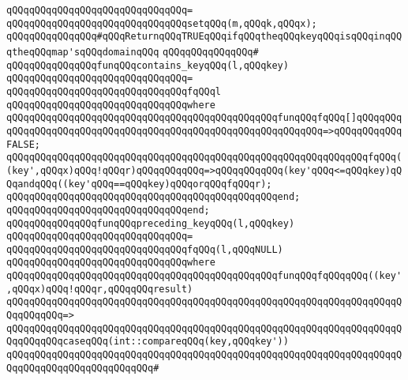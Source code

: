 \verb|qQQqqQQqqQQqqQQqqQQqqQQqqQQqqQQq=|\newline
\verb|qQQqqQQqqQQqqQQqqQQqqQQqqQQqqQQqsetqQQq(m,qQQqk,qQQqx);|\newline
\newline
\newline
\verb|qQQqqQQqqQQqqQQq#qQQqReturnqQQqTRUEqQQqifqQQqtheqQQqkeyqQQqisqQQqinqQQqtheqQQqmap'sqQQqdomainqQQq|\newline
\verb|qQQqqQQqqQQqqQQq#|\newline
\verb|qQQqqQQqqQQqqQQqfunqQQqcontains_keyqQQq(l,qQQqkey)|\newline
\verb|qQQqqQQqqQQqqQQqqQQqqQQqqQQqqQQq=|\newline
\verb|qQQqqQQqqQQqqQQqqQQqqQQqqQQqqQQqfqQQql|\newline
\verb|qQQqqQQqqQQqqQQqqQQqqQQqqQQqqQQqwhere|\newline
\verb|qQQqqQQqqQQqqQQqqQQqqQQqqQQqqQQqqQQqqQQqqQQqqQQqfunqQQqfqQQq[]qQQqqQQqqQQqqQQqqQQqqQQqqQQqqQQqqQQqqQQqqQQqqQQqqQQqqQQqqQQqqQQq=>qQQqqQQqqQQqFALSE;|\newline
\verb|qQQqqQQqqQQqqQQqqQQqqQQqqQQqqQQqqQQqqQQqqQQqqQQqqQQqqQQqqQQqqQQqfqQQq((key',qQQqx)qQQq!qQQqr)qQQqqQQqqQQq=>qQQqqQQqqQQq(key'qQQq<=qQQqkey)qQQqandqQQq((key'qQQq==qQQqkey)qQQqorqQQqfqQQqr);|\newline
\verb|qQQqqQQqqQQqqQQqqQQqqQQqqQQqqQQqqQQqqQQqqQQqqQQqend;|\newline
\verb|qQQqqQQqqQQqqQQqqQQqqQQqqQQqqQQqend;|\newline
\newline
\verb|qQQqqQQqqQQqqQQqfunqQQqpreceding_keyqQQq(l,qQQqkey)|\newline
\verb|qQQqqQQqqQQqqQQqqQQqqQQqqQQqqQQq=|\newline
\verb|qQQqqQQqqQQqqQQqqQQqqQQqqQQqqQQqfqQQq(l,qQQqNULL)|\newline
\verb|qQQqqQQqqQQqqQQqqQQqqQQqqQQqqQQqwhere|\newline
\verb|qQQqqQQqqQQqqQQqqQQqqQQqqQQqqQQqqQQqqQQqqQQqqQQqfunqQQqfqQQqqQQq((key',qQQqx)qQQq!qQQqr,qQQqqQQqresult)|\newline
\verb|qQQqqQQqqQQqqQQqqQQqqQQqqQQqqQQqqQQqqQQqqQQqqQQqqQQqqQQqqQQqqQQqqQQqqQQqqQQqqQQq=>|\newline
\verb|qQQqqQQqqQQqqQQqqQQqqQQqqQQqqQQqqQQqqQQqqQQqqQQqqQQqqQQqqQQqqQQqqQQqqQQqqQQqqQQqcaseqQQq(int::compareqQQq(key,qQQqkey'))|\newline
\verb|qQQqqQQqqQQqqQQqqQQqqQQqqQQqqQQqqQQqqQQqqQQqqQQqqQQqqQQqqQQqqQQqqQQqqQQqqQQqqQQqqQQqqQQqqQQqqQQq#|\newline

